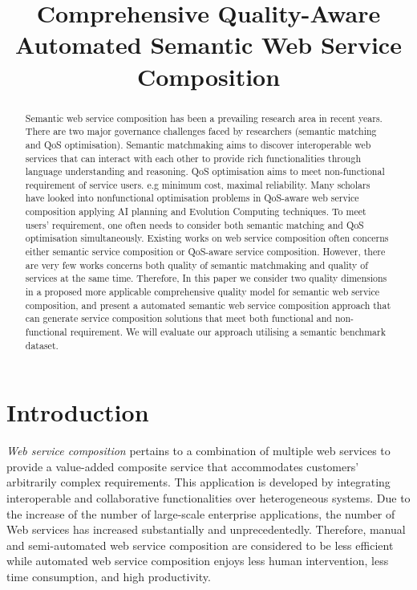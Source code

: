 \documentclass{IEEEtran}
\title{Comprehensive Quality-Aware Automated Semantic Web Service Composition}
\begin{document}
\maketitle
\vspace{-0.8cm}

\begin{abstract}
Semantic web service composition has been a prevailing research area in recent years. There are two major governance challenges faced by researchers (semantic matching and QoS optimisation). Semantic matchmaking aims to discover interoperable web services that can interact with each other to provide rich functionalities through language understanding and reasoning. QoS optimisation aims to meet non-functional requirement of service users. e.g minimum cost, maximal reliability. Many scholars have looked into nonfunctional optimisation problems in QoS-aware web service composition applying AI planning and Evolution Computing techniques. To meet users' requirement, one often needs to consider both semantic matching and QoS optimisation simultaneously. Existing works on web service composition often concerns either semantic service composition or QoS-aware service composition. However, there are very few works concerns both quality of semantic matchmaking and quality of services at the same time. Therefore, In this paper we consider two quality dimensions in a proposed more applicable comprehensive quality model for semantic web service composition, and present a automated semantic web service composition approach that can generate service composition solutions that meet both functional and non-functional requirement. We will evaluate our approach utilising a semantic benchmark dataset.

\end{abstract}
\vspace{-0.8cm}
\section{Introduction}\label{introduction}

\textit{Web service composition} pertains to a combination of multiple web services to provide a value-added composite service that accommodates customers' arbitrarily complex requirements. This application is developed by integrating interoperable and collaborative functionalities over heterogeneous systems. Due to the increase of the number of large-scale enterprise applications, the number of Web services has increased substantially and unprecedentedly. Therefore, manual and semi-automated web service composition are considered to be less efficient while automated web service composition enjoys less human intervention, less time consumption, and high productivity.
\end{document}
